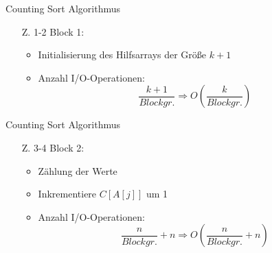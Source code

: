 \documentclass{beamer}
\begin{document}
\begin{frame}{Counting Sort Algorithmus}

  \begin{itemize}
    \item[Z. 1-2] Block 1:
    \begin{itemize}
      \item Initialisierung des Hilfsarrays der Größe $k+1$
      \item Anzahl I/O-Operationen:
            \[
              \frac{k+1}{Blockgr.} \Rightarrow O(\frac{k}{Blockgr.})
            \]
    \end{itemize}
  \end{itemize}
  \vspace{1cm}
  \begin{figure}
    \flushright
  \end{figure}
\end{frame}

\begin{frame}{Counting Sort Algorithmus}
  \begin{itemize}
    \item[Z. 3-4] Block 2:
    \begin{itemize}
      \item Zählung der Werte
      \item Inkrementiere $C[A[j]]$ um 1
      \item Anzahl I/O-Operationen:
            \[
              \frac{n}{Blockgr.} + n \Rightarrow O(\frac{n}{Blockgr.} + n)
            \]
    \end{itemize}
  \end{itemize}
  \vspace{1cm}
  \begin{figure}
    \flushright
  \end{figure}
\end{frame}
\end{document}
